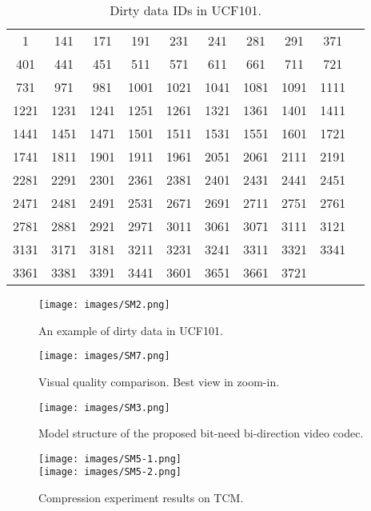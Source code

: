 \documentclass[sigconf]{acmart}
\begin{document}
\begin{table}[h]
    \caption{Dirty data IDs in UCF101.}
    \label{tab-sm2}
	\centering
	\begin{tabular}{c c c c c c c c c c}
	    \midrule 1& 141& 171& 191& 231& 241& 281& 291& 371\\
	     401& 441& 451& 511& 571& 611& 661& 711& 721\\
	     731& 971& 981& 1001& 1021& 1041& 1081& 1091& 1111\\
	     1221& 1231& 1241& 1251& 1261& 1321& 1361& 1401& 1411\\
	     1441& 1451& 1471& 1501& 1511& 1531& 1551& 1601& 1721\\
	     1741& 1811& 1901& 1911& 1961& 2051& 2061& 2111& 2191\\
	     2281& 2291& 2301& 2361& 2381& 2401& 2431& 2441& 2451\\
	     2471& 2481& 2491& 2531& 2671& 2691& 2711& 2751& 2761\\
	     2781& 2881& 2921& 2971& 3011& 3061& 3071& 3111& 3121\\ 3131& 3171& 3181& 3211& 3231& 3241& 3311& 3321& 3341\\
	     3361& 3381& 3391& 3441& 3601& 3651& 3661& 3721& \\
	    \midrule \end{tabular}
\end{table}
\begin{figure}[h]
    \centering
    \texttt{[image: images/SM2.png]}
    \caption{An example of dirty data in UCF101.}
    \label{fig-sm2}
\end{figure}

\begin{figure*}[h]
    \centering
    \texttt{[image: images/SM7.png]}
    \caption{Visual quality comparison. Best view in zoom-in.}
    \label{fig-sm7}
\end{figure*}

\begin{figure*}[t]
    \centering
    \texttt{[image: images/SM3.png]}
    \caption{Model structure of the proposed bit-need bi-direction video codec.}
    \label{fig-sm3}
\end{figure*}

\begin{figure}[h]
    \centering
    \texttt{[image: images/SM5-1.png]}\\
    \texttt{[image: images/SM5-2.png]}
    \caption{Compression experiment results on TCM.}
    \label{fig-sm4}
\end{figure}
\end{document}
